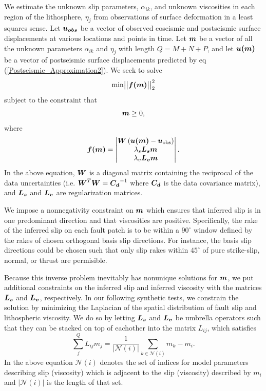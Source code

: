 \documentclass[extra]{gji}
\begin{document}
We estimate the unknown slip parameters, $\alpha_{ik}$, and unknown
viscosities in each region of the lithosphere, $\eta_j$ from
observations of surface deformation in a least squares sense. Let
$\mitbf{u_{obs}}$ be a vector of observed coseismic and postseismic
surface displacements at various locations and points in time.  Let
$\mitbf{m}$ be a vector of all the unknown parameters $\alpha_{ik}$
and $\eta_j$ with length $Q=M+N+P$, and let $\mitbf{u(m)}$ be a vector
of postseismic surface displacements predicted by eq
(\ref{Postseismic_Approximation2}). We seek to solve
\begin{equation}\label{Inverse_Problem}
  \mathrm{min}
  \big|\big|\mitbf{f(m)}\big|\big|_2^2
\end{equation}
subject to the constraint that
\begin{equation}
  \mitbf{m}\geq0,
\end{equation}
where 
\begin{equation}\label{ResidualFunction}
  \mitbf{f(m)} = 
    \begin{vmatrix}
      \mitbf{W}\left(\mitbf{u(m)}-\mitbf{u}_{\mathrm{obs}}\right)\\
      \lambda_s\mitbf{L_sm}\\
      \lambda_v\mitbf{L_vm}\\
    \end{vmatrix} .
\end{equation}  
In the above equation, $\mitbf{W}$ is a diagonal matrix containing the
reciprocal of the data uncertainties
(i.e. $\mitbf{W}^T\mitbf{W}=\mitbf{C_d}^{-1}$ where $\mitbf{C_d}$ is
the data covariance matrix), and $\mitbf{L_s}$ and $\mitbf{L_v}$ are
regularization matrices.

We impose a nonnegativity constraint on $\mitbf{m}$ which ensures that
inferred slip is in one predominant direction and that viscosities are
positive.  Specifically, the rake of the inferred slip on each fault
patch is to be within a $90^\circ$ window defined by the rakes of
chosen orthogonal basis slip directions. For instance, the basis slip
directions could be chosen such that only slip rakes within $45^\circ$
of pure strike-slip, normal, or thrust are permisible.

Because this inverse problem inevitably has nonunique solutions for
$\mitbf{m}$, we put additional constraints on the inferred slip and
inferred viscosity with the matrices $\mitbf{L_s}$ and $\mitbf{L_v}$,
respectively.  In our following synthetic tests, we constrain the
solution by minimizing the Laplacian of the spatial distribution of
fault slip and lithospheric viscosity.  We do so by letting
$\mitbf{L_s}$ and $\mitbf{L_v}$ be umbrella operators \citep{D1999}
such that they can be stacked on top of eachother into the matrix $L_{ij}$,
which satisfies
\begin{equation}
  \sum_j^{Q}L_{ij}m_j = \frac{1}{|\mathcal{N}(i)|}\sum_{k\in \mathcal{N}(i)} m_k - m_i.
\end{equation}
In the above equation $\mathcal{N}(i)$ denotes the set of indices for
model parameters describing slip (viscosity) which is adjacent to the
slip (viscosity) described by $m_i$ and $|\mathcal{N}(i)|$ is the
length of that set.
\end{document}
